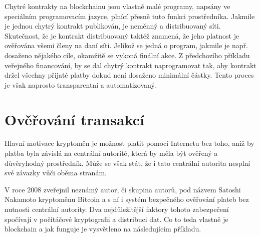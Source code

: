 Chytré kontrakty na blockchainu jsou vlastně malé programy, napsány ve speciálním programovacím jazyce, plnící přesně tuto funkci prostředníka.
Jakmile je jednou chytrý kontrakt publikován, je neměnný a distribuovaný síti. Skutečnost, že je kontrakt distribuovaný
taktéž znamená, že jeho platnost je ověřována všemi členy na daní síti.
Jelikož se jedná o program, jakmile je např. dosaženo nějakého cíle, okamžitě se vykoná finální akce. Z předchozího příkladu veřejného
financování, by se dal chytrý kontrakt naprogramovat tak, aby kontrakt držel všechny přijaté platby dokud není dosaženo minimální částky.
Tento proces je však naprosto transparentní a automatizovaný.


\section{Ověřování transakcí}
\label{sec:BlockchainSecurity}
Hlavní motivace kryptoměn je možnost platit pomocí Internetu bez toho, aniž by platba byla závislá na centrální autoritě, která by měla
být ověřený a důvěryhodný prostředník. Může se však stát, že i tato centrální autorita nesplní své závazky vůči oběma stranám.

V roce 2008 zveřejnil neznámý autor, či skupina autorů, pod názvem Satoshi Nakamoto kryptoměnu Bitcoin a s ní i systém bezpečného
ověřování plateb bez nutnosti centrální autority. Dva nejdůležitější faktory tohoto zabezpečení spočívají v počítáčové kryptografii
a distribuci dat. Co to teda vlastně je blockchain a jak funguje je vysvětleno na následujícím příkladu.

